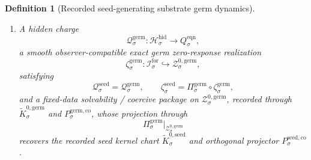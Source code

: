 \documentclass[11pt]{article}
\newcommand{\ForSpace}[1]{\mathcal I_{#1}^{\mathrm{for}}}
\newcommand{\EqnTarget}[1]{Q_{#1}^{\mathrm{eqn}}}
\newcommand{\HiddenSpace}[1]{\mathcal H_{#1}^{\mathrm{hid}}}
\newcommand{\HiddenBody}[1]{D_{#1}^{\mathrm{hid}}}
\newcommand{\SeedZeroCore}[1]{\mathcal Z_{#1}^{0,\mathrm{seed}}}
\newcommand{\SeedSplit}[1]{\Phi_{#1}^{\mathrm{seed}}}
\newcommand{\SeedCharge}[1]{\mathcal Q_{#1}^{\mathrm{seed}}}
\newcommand{\SeedEmbed}[1]{\zeta_{#1}^{\mathrm{seed}}}
\newcommand{\SeedKernelCh}[1]{\widetilde K_{#1}^{0,\mathrm{seed}}}
\newcommand{\SeedStateComp}[1]{P_{#1}^{\mathrm{seed,co}}}
\newcommand{\GermProj}[1]{\Pi_{#1}^{\mathrm{germ}}}
\newcommand{\GermShellSet}[1]{\mathcal Z_{#1}^{\mathrm{germ}}}
\newcommand{\GermZeroCore}[1]{\mathcal Z_{#1}^{0,\mathrm{germ}}}
\newcommand{\GermSplit}[1]{\Phi_{#1}^{\mathrm{germ}}}
\newcommand{\GermCharge}[1]{\mathcal Q_{#1}^{\mathrm{germ}}}
\newcommand{\GermEmbed}[1]{\zeta_{#1}^{\mathrm{germ}}}
\newcommand{\GermKernelCh}[1]{\widetilde K_{#1}^{0,\mathrm{germ}}}
\newcommand{\GermStateComp}[1]{P_{#1}^{\mathrm{germ,co}}}
\newtheorem{definition}{Definition}
\begin{document}
\begin{definition}[Recorded seed-generating substrate germ dynamics]
\begin{enumerate}
    \[
    \GermProj{\sigma}\big|_{\GermZeroCore{\sigma}}
    :
    \GermZeroCore{\sigma}
    \xrightarrow{\cong}
    \SeedZeroCore{\sigma},
    \]
    and a split diffeomorphism
    \[
    \GermSplit{\sigma}:
    \GermZeroCore{\sigma}\times\HiddenBody{\sigma}
    \xrightarrow{\cong}
    \GermShellSet{\sigma}
    \]
    obeying the projected split identity
    \[
    \SeedSplit{\sigma}(z,\eta)
    =
    \GermProj{\sigma}\Bigl(
    \GermSplit{\sigma}\bigl(
    (\GermProj{\sigma}\big|_{\GermZeroCore{\sigma}})^{-1}(z),\eta
    \bigr)\Bigr)
    \]
    for every \(z\in\SeedZeroCore{\sigma}\) and every \(\eta\in\HiddenBody{\sigma}\).
    \item A hidden charge
    \[
    \GermCharge{\sigma}:\HiddenSpace{\sigma}\to\EqnTarget{\sigma},
    \]
    a smooth observer-compatible exact germ zero-response realization
    \[
    \GermEmbed{\sigma}:\ForSpace{\sigma}\hookrightarrow\GermZeroCore{\sigma},
    \]
    satisfying
    \[
    \SeedCharge{\sigma}
    =
    \GermCharge{\sigma},
    \qquad
    \SeedEmbed{\sigma}
    =
    \GermProj{\sigma}\circ\GermEmbed{\sigma},
    \]
    and a fixed-data solvability / coercive package on \(\GermZeroCore{\sigma}\), recorded through \(\GermKernelCh{\sigma}\) and \(\GermStateComp{\sigma}\), whose projection through
    \[
    \GermProj{\sigma}\big|_{\GermZeroCore{\sigma}}
    \]
    recovers the recorded seed kernel chart \(\SeedKernelCh{\sigma}\) and orthogonal projector \(\SeedStateComp{\sigma}\).
\end{enumerate}
\end{definition}
\end{document}
